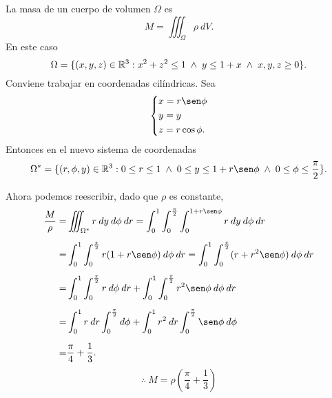 \begin{solution}
    La masa de un cuerpo de volumen $\Omega$ es
    \[
        M=\iiint_\Omega \rho\:dV.
    \]
    En este caso
    \[
        \Omega=\{(x,y,z)\in\mathbb{R}^3:x^2+z^2\leq1\;\land\;y\leq1+x\; \land\;x,y,z\geq0\}.
    \]
    Conviene trabajar en coordenadas cil\'indricas. Sea
    \[\begin{dcases}
            x=r\sen\phi \\
            y=y         \\
            z=r\cos\phi.
        \end{dcases}\]
    Entonces en el nuevo sistema de coordenadas
    \[
        \Omega^*=\{(r,\phi,y)\in\Rn{3}:    0\leq  r\leq1\; \land\; 0 \leq y\leq1+r\sen\phi\;\land\;  0\leq\phi\leq\frac{\pi}{2}\}.
    \]

    Ahora podemos reescribir, dado que $\rho$ es constante,
    \begin{align*}
        \frac{M}{\rho} = & \iiint_{\Omega^*} r\:dy\:d\phi\:dr=\int_0^1 \int_0^{\frac{\pi}{2}} \int_0^{1+r\sen\phi} r\:dy\:d\phi\:dr \\[.2cm]
        =                & \int_0^1 \int_0^{\frac{\pi}{2}}r(1+r\sen\phi)\:d\phi\:dr=\int_0^1 \int_0^{\frac{\pi}{2}} ( r+r^2\sen\phi) \:d\phi\:dr \\[.2cm]
        =                & \int_0^1\int_0^{\frac{\pi}{2}} r\:d\phi\:dr+\int_0^1\int_0^{\frac{\pi}{2}}r^2\sen\phi\:d\phi\:dr                      \\[.2cm]
        =                & \int_0^1r\:dr\int_0^{\frac{\pi}{2}}d\phi+\int_0^1r^2\:dr\int_0^{\frac{\pi}{2}}\sen\phi\:d\phi                         \\[.2cm]
        =                & \frac{\pi}{4}+\frac{1}{3}.
    \end{align*}
    \[
        \therefore\:M=\rho\left(\frac{\pi}{4}+\frac{1}{3}\right)
    \]
\end{solution}


